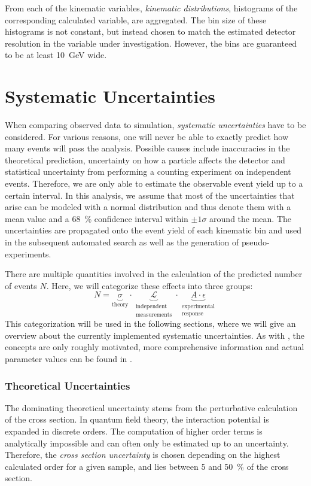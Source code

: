From each of the kinematic variables, \emph{kinematic distributions}, histograms of the corresponding calculated variable, are aggregated. The bin size of these histograms is not constant, but instead chosen to match the estimated detector resolution in the variable under investigation. However, the bins are guaranteed to be at least \SI{10}{\GeV} wide.

\section{Systematic Uncertainties}
When comparing observed data to simulation, \emph{systematic uncertainties} have to be considered. For various reasons, one will never be able to exactly predict how many events will pass the analysis. Possible causes include inaccuracies in the theoretical prediction, uncertainty on how a particle affects the detector and statistical uncertainty from performing a counting experiment on independent events. 
Therefore, we are only able to estimate the observable event yield up to a certain interval. In this analysis, we assume that most of the uncertainties that arise can be modeled with a normal distribution and thus denote them with a mean value and a \SI{68}{\percent} confidence interval within $\pm 1 \sigma$ around the mean. The uncertainties are propagated onto the event yield of each kinematic bin and used in the subsequent automated search as well as the generation of pseudo-experiments.

There are multiple quantities involved in the calculation of the predicted number of events $N$. Here, we will categorize these effects into three groups:
\begin{equation}
N = \underbrace{\sigma}_\text{theory} \cdot \underbrace{\mathcal{L}}_{\substack{\text{independent} \\ \text{measurements}}} \cdot \underbrace{A \cdot \epsilon}_{\substack{\text{experimental} \\ \text{response}}}  
\end{equation}
This categorization will be used in the following sections, where we will give an overview about the currently implemented systematic uncertainties. As with , the concepts are only roughly motivated, more comprehensive information and actual parameter values can be found in \cite{Roemer:ModelUnspecificSearch}.

\subsubsection{Theoretical Uncertainties}
The dominating theoretical uncertainty stems from the perturbative calculation of the cross section. In quantum field theory, the interaction potential is expanded in discrete orders. The computation of higher order terms is analytically impossible and can often only be estimated up to an uncertainty. Therefore, the \emph{cross section uncertainty} is chosen depending on the highest calculated order for a given sample, and lies between \num{5} and \SI{50}{\percent} of the cross section.

